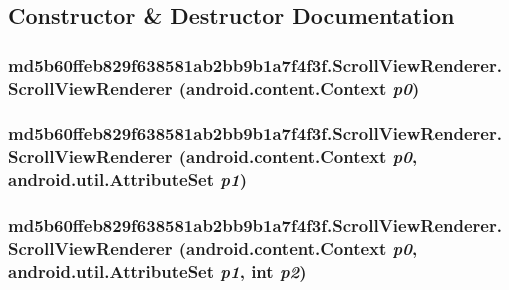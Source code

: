 \subsection{Constructor \& Destructor Documentation}
\hypertarget{classmd5b60ffeb829f638581ab2bb9b1a7f4f3f_1_1_scroll_view_renderer_02512d520220cf6181e8a53806b72506}{
\subsubsection[{ScrollViewRenderer}]{\setlength{\rightskip}{0pt plus 5cm}md5b60ffeb829f638581ab2bb9b1a7f4f3f.ScrollViewRenderer.ScrollViewRenderer (android.content.Context {\em p0})}}
\label{classmd5b60ffeb829f638581ab2bb9b1a7f4f3f_1_1_scroll_view_renderer_02512d520220cf6181e8a53806b72506}


\hypertarget{classmd5b60ffeb829f638581ab2bb9b1a7f4f3f_1_1_scroll_view_renderer_d686631aae6194ffcd34b7e3a9c0643d}{
\subsubsection[{ScrollViewRenderer}]{\setlength{\rightskip}{0pt plus 5cm}md5b60ffeb829f638581ab2bb9b1a7f4f3f.ScrollViewRenderer.ScrollViewRenderer (android.content.Context {\em p0}, \/  android.util.AttributeSet {\em p1})}}
\label{classmd5b60ffeb829f638581ab2bb9b1a7f4f3f_1_1_scroll_view_renderer_d686631aae6194ffcd34b7e3a9c0643d}


\hypertarget{classmd5b60ffeb829f638581ab2bb9b1a7f4f3f_1_1_scroll_view_renderer_476765090c78d15df5e61c632e53be4f}{
\subsubsection[{ScrollViewRenderer}]{\setlength{\rightskip}{0pt plus 5cm}md5b60ffeb829f638581ab2bb9b1a7f4f3f.ScrollViewRenderer.ScrollViewRenderer (android.content.Context {\em p0}, \/  android.util.AttributeSet {\em p1}, \/  int {\em p2})}}
\label{classmd5b60ffeb829f638581ab2bb9b1a7f4f3f_1_1_scroll_view_renderer_476765090c78d15df5e61c632e53be4f}


